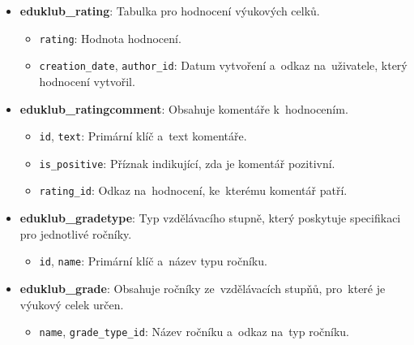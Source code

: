 \documentclass[male,czech,api_bc]{kitheses}
\begin{document}
\begin{itemize}
	\item \textbf{eduklub\_rating}: Tabulka pro hodnocení výukových celků.
	\begin{itemize}
		\item \texttt{rating}: Hodnota hodnocení.
		\item \texttt{creation\_date}, \texttt{author\_id}: Datum vytvoření a~odkaz na~uživatele, který hodnocení vytvořil.
	\end{itemize}
	
	\item \textbf{eduklub\_ratingcomment}: Obsahuje komentáře k~hodnocením.
	\begin{itemize}
		\item \texttt{id}, \texttt{text}: Primární klíč a~text komentáře.
		\item \texttt{is\_positive}: Příznak indikující, zda je komentář pozitivní.
		\item \texttt{rating\_id}: Odkaz na~hodnocení, ke~kterému komentář patří.
	\end{itemize}
	
	\item \textbf{eduklub\_gradetype}: Typ vzdělávacího stupně, který poskytuje specifikaci pro jednotlivé ročníky.
	\begin{itemize}
		\item \texttt{id}, \texttt{name}: Primární klíč a~název typu ročníku.
	\end{itemize}
	
	\item \textbf{eduklub\_grade}: Obsahuje ročníky ze~vzdělávacích stupňů, pro~které je výukový celek určen.
	\begin{itemize}
		\item \texttt{name}, \texttt{grade\_type\_id}: Název ročníku a~odkaz na~typ ročníku.
	\end{itemize}
\end{itemize}
\end{document}
